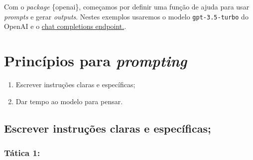 \documentclass[
  letterpaper,
  paper=6in:9in,
  pagesize=pdftex,
  headinclude=on,
  footinclude=on,
  12pt]{scrbook}
\newenvironment{Shaded}{\begin{snugshade}}{\end{snugshade}}
\newcommand{\AttributeTok}[1]{\textcolor[rgb]{0.40,0.45,0.13}{#1}}
\newcommand{\ControlFlowTok}[1]{\textcolor[rgb]{0.00,0.23,0.31}{#1}}
\newcommand{\FunctionTok}[1]{\textcolor[rgb]{0.28,0.35,0.67}{#1}}
\newcommand{\NormalTok}[1]{\textcolor[rgb]{0.00,0.23,0.31}{#1}}
\newcommand{\OtherTok}[1]{\textcolor[rgb]{0.00,0.23,0.31}{#1}}
\newcommand{\SpecialCharTok}[1]{\textcolor[rgb]{0.37,0.37,0.37}{#1}}
\newcommand{\StringTok}[1]{\textcolor[rgb]{0.13,0.47,0.30}{#1}}
\providecommand{\tightlist}{%
  \setlength{\itemsep}{0pt}\setlength{\parskip}{0pt}}\usepackage{longtable,booktabs,array}
\begin{document}
Com o \emph{package} \{openai\}, começamos por definir uma função de
ajuda para usar \emph{prompts} e gerar \emph{outputs}. Nestes exemplos
usaremos o modelo \texttt{gpt-3.5-turbo} do OpenAI e o
\href{https://platform.openai.com/docs/guides/chat}{chat completions
endpoint.}.

\begin{Shaded}
\end{Shaded}

\hypertarget{princuxedpios-para-prompting}{%
\section{\texorpdfstring{Princípios para
\emph{prompting}}{Princípios para prompting}}\label{princuxedpios-para-prompting}}

\begin{enumerate}
\def\labelenumi{\arabic{enumi}.}
\tightlist
\item
  Escrever instruções claras e específicas;
\item
  Dar tempo ao modelo para pensar.
\end{enumerate}

\hypertarget{escrever-instruuxe7uxf5es-claras-e-especuxedficas}{%
\subsection{Escrever instruções claras e
específicas;}\label{escrever-instruuxe7uxf5es-claras-e-especuxedficas}}

\hypertarget{tuxe1tica-1}{%
\subsubsection{Tática 1:}\label{tuxe1tica-1}}
\end{document}
